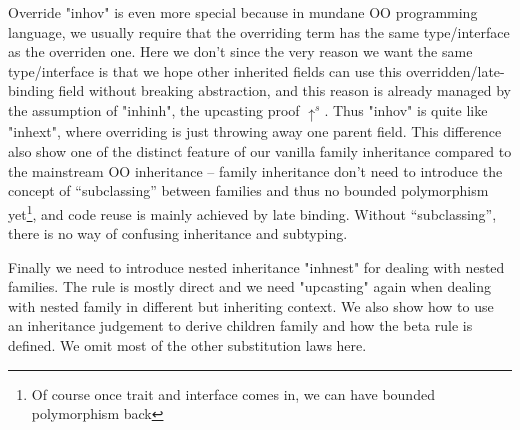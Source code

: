 Override "inhov" is even more special because in mundane OO programming language, we usually require that the overriding term has the same type/interface as the overriden one.  Here we don't since the very reason we want the same type/interface is that we hope other inherited fields can use this overridden/late-binding field without breaking abstraction, and this reason is already managed by the assumption of "inhinh", the upcasting proof $\uparrow^s$. Thus "inhov" is quite like "inhext", where overriding is just throwing away one parent field. This difference also show one of the distinct feature of our vanilla family inheritance compared to the mainstream OO inheritance -- family inheritance don't need to introduce the concept of ``subclassing'' between families and thus no bounded polymorphism yet\footnote{Of course once trait and interface comes in, we can have bounded polymorphism back}, and code reuse is mainly achieved by late binding. Without ``subclassing'', there is no way of confusing inheritance and subtyping.

Finally we need to introduce nested inheritance "inhnest" for dealing with nested families. The rule is mostly direct and we need "upcasting" again when dealing with nested family in different but inheriting context.  We also show how to use an inheritance judgement to derive children family and how the beta rule is defined. We omit most of the other substitution laws here.




